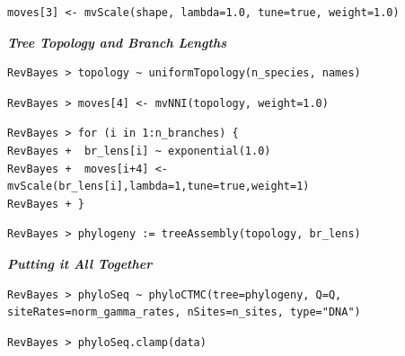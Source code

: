 \documentclass[11pt]{article}
\begin{document}
{\tt \begin{snugshade*}
\begin{lstlisting}
moves[3] <- mvScale(shape, lambda=1.0, tune=true, weight=1.0)\end{lstlisting}
\end{snugshade*}}


\textbf{\textit{Tree Topology and Branch Lengths}}

{\tt \begin{snugshade*}
\begin{lstlisting}
RevBayes > topology ~ uniformTopology(n_species, names)
\end{lstlisting}
\end{snugshade*}}

{\tt \begin{snugshade*}
\begin{lstlisting}
RevBayes > moves[4] <- mvNNI(topology, weight=1.0)
\end{lstlisting}
\end{snugshade*}}

{\tt \small \begin{snugshade*}
\begin{lstlisting}
RevBayes > for (i in 1:n_branches) {
RevBayes +  br_lens[i] ~ exponential(1.0)
RevBayes +  moves[i+4] <- mvScale(br_lens[i],lambda=1,tune=true,weight=1) 
RevBayes + }
\end{lstlisting}
\end{snugshade*}}

{\tt \begin{snugshade*}
\begin{lstlisting}
RevBayes > phylogeny := treeAssembly(topology, br_lens)
\end{lstlisting}
\end{snugshade*}}




\textbf{\textit{Putting it All Together}}

{\tt \begin{snugshade*}
\begin{lstlisting}
RevBayes > phyloSeq ~ phyloCTMC(tree=phylogeny, Q=Q, siteRates=norm_gamma_rates, nSites=n_sites, type="DNA")
\end{lstlisting}
\end{snugshade*}}

{\tt \begin{snugshade*}
\begin{lstlisting}
RevBayes > phyloSeq.clamp(data)
\end{lstlisting}
\end{snugshade*}}
\end{document}
